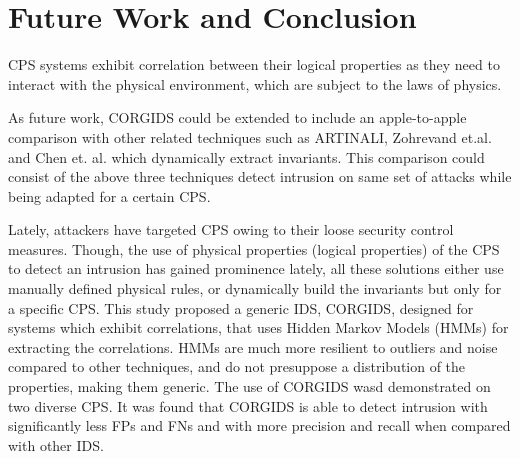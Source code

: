 
\chapter{\textbf{Future Work and Conclusion}}
\label{sec8:Conclusion}

CPS systems exhibit correlation between their logical properties as they need to interact with the physical environment, which are subject to the laws of physics.

As future work, CORGIDS could be extended to include an apple-to-apple comparison with other related techniques such as ARTINALI, Zohrevand et.al. and Chen et. al. which dynamically extract invariants. This comparison could consist of the above three techniques detect intrusion on same set of attacks while being adapted for a certain CPS.

Lately, attackers have targeted CPS owing to their loose security control measures. Though, the use of physical properties (logical properties) of the CPS to detect an intrusion has gained prominence lately, all these solutions either use manually defined physical rules, or dynamically build the invariants but only for a specific CPS. This study proposed a generic IDS, CORGIDS, designed for systems which exhibit correlations, that uses Hidden Markov Models (HMMs) for extracting the correlations. HMMs are much more resilient to outliers and noise compared to other techniques, and do not presuppose a distribution of the properties, making them generic.
The use of CORGIDS wasd demonstrated on two diverse CPS. It was found that CORGIDS is able to detect intrusion with significantly less FPs and FNs and with more precision and recall when compared with other IDS. 
 \endinput
